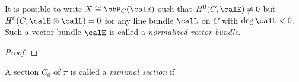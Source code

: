 
    \begin{lemma}\label{lem:existence_of_normalized_vector_bundle}
        It is possible to write \(X \cong \bbP_C(\calE)\) such that \(H^0(C,\calE) \neq 0\) but \(H^0(C,\calE \otimes \calL) = 0\) for any line bundle \(\calL\) on \(C\) with \(\deg \calL < 0\).
        Such a vector bundle \(\calE\) is called a \emph{normalized vector bundle}.
    \end{lemma}
    \begin{proof}
    \end{proof}


    \begin{definition}\label{def:minimal_section_of_ruled_surface}
        A section \(C_0\) of \(\pi\) is called a \emph{minimal section} if 
    \end{definition}

